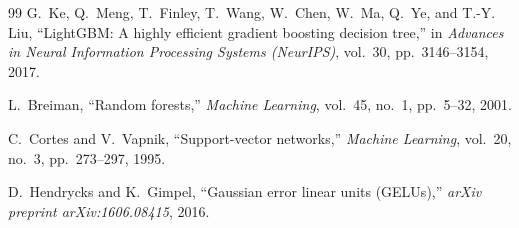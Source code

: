 \documentclass[11pt,a4paper]{article}
\begin{document}
\begin{thebibliography}{99}
G.~Ke, Q.~Meng, T.~Finley, T.~Wang, W.~Chen, W.~Ma, Q.~Ye, and T.-Y. Liu, ``LightGBM: A highly efficient gradient boosting decision tree,'' in \emph{Advances in Neural Information Processing Systems (NeurIPS)}, vol.~30, pp.~3146--3154, 2017.

L.~Breiman, ``Random forests,'' \emph{Machine Learning}, vol.~45, no.~1, pp.~5--32, 2001.

C.~Cortes and V.~Vapnik, ``Support-vector networks,'' \emph{Machine Learning}, vol.~20, no.~3, pp.~273--297, 1995.

D.~Hendrycks and K.~Gimpel, ``Gaussian error linear units (GELUs),'' \emph{arXiv preprint arXiv:1606.08415}, 2016.
\end{thebibliography}
\end{document}
